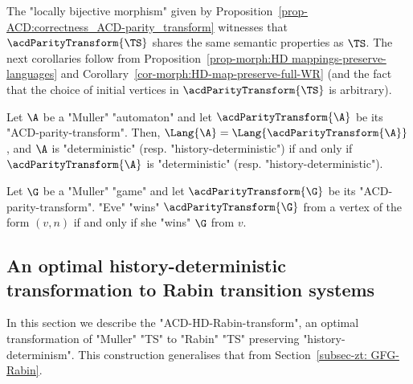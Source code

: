 \documentclass{theoretics}
\begin{document}
The "locally bijective morphism" given by Proposition~\ref{prop-ACD:correctness_ACD-parity_transform} witnesses that $\acdParityTransform{\TS}$ shares the same semantic properties as $\TS$. The next corollaries follow from Proposition~\ref{prop-morph:HD mappings-preserve-languages} and Corollary~\ref{cor-morph:HD-map-preserve-full-WR} (and the fact that the choice of initial vertices in $\acdParityTransform{\TS}$ is arbitrary).

\begin{corollary}
	Let $\A$ be a "Muller" "automaton" and let $\acdParityTransform{\A}$ be its "ACD-parity-transform". Then, $\Lang{\A} = \Lang{\acdParityTransform{\A}}$, and $\A$ is "deterministic" (resp. "history-deterministic") if and only if $\acdParityTransform{\A}$ is "deterministic" (resp. "history-deterministic").
\end{corollary}


\begin{corollary}
	Let $\G$ be a "Muller" "game" and let $\acdParityTransform{\G}$ be its "ACD-parity-transform". "Eve" "wins" $\acdParityTransform{\G}$ from a vertex	of the form $(v,n)$ if and only if she "wins" $\G$ from $v$.
\end{corollary}


\subsection{An optimal history-deterministic transformation to Rabin transition systems}\label{subsec-acd: HD-Rabin-transformation}

In this section we describe the "ACD-HD-Rabin-transform", an optimal transformation of "Muller" "TS" to "Rabin" "TS" preserving "history-determinism". This construction generalises that from Section~\ref{subsec-zt: GFG-Rabin}.
\end{document}
